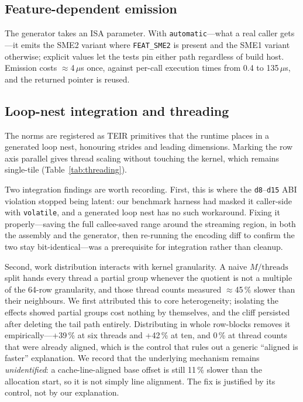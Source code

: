 \documentclass[conference,10pt]{IEEEtran}
\newcommand{\code}[1]{\texttt{\small #1}}
\begin{document}
\subsection{Feature-dependent emission}

The generator takes an ISA parameter. With \code{automatic}---what a real caller
gets---it emits the SME2 variant where \code{FEAT\_SME2} is present and the SME1
variant otherwise; explicit values let the tests pin either path regardless of
build host. Emission costs $\approx$4\,$\mu$s once, against per-call execution
times from 0.4 to 135\,$\mu$s, and the returned pointer is reused.

\subsection{Loop-nest integration and threading}

The norms are registered as TEIR primitives that the runtime places in a
generated loop nest, honouring strides and leading dimensions. Marking the row
axis parallel gives thread scaling without touching the kernel, which remains
single-tile (Table~\ref{tab:threading}).

Two integration findings are worth recording. First, this is where the
\code{d8}--\code{d15} ABI violation stopped being latent: our benchmark harness
had masked it caller-side with \code{volatile}, and a generated loop nest has no
such workaround. Fixing it properly---saving the full callee-saved range around
the streaming region, in both the assembly and the generator, then re-running
the encoding diff to confirm the two stay bit-identical---was a prerequisite for
integration rather than cleanup.

Second, work distribution interacts with kernel granularity. A naive
$M/\text{threads}$ split hands every thread a partial group whenever the
quotient is not a multiple of the 64-row granularity, and those thread counts
measured $\approx$45\,\% slower than their neighbours. We first attributed this
to core heterogeneity; isolating the effects showed partial groups cost nothing
by themselves, and the cliff persisted after deleting the tail path entirely.
Distributing in whole row-blocks removes it empirically---+39\,\% at six threads
and +42\,\% at ten, and 0\,\% at thread counts that were already aligned, which
is the control that rules out a generic ``aligned is faster'' explanation. We
record that the underlying mechanism remains \emph{unidentified}: a
cache-line-aligned base offset is still 11\,\% slower than the allocation start,
so it is not simply line alignment. The fix is justified by its control, not by
our explanation.
\end{document}
